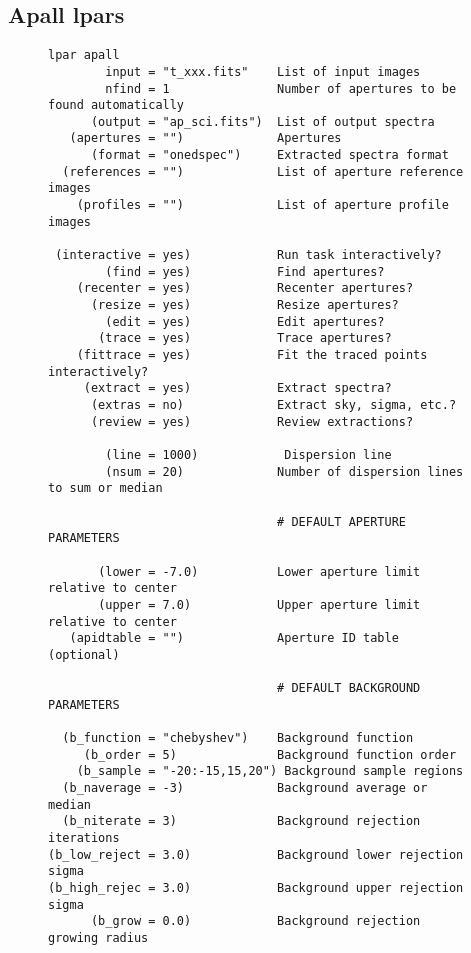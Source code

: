 \subsection{Apall lpars} \label{sec:Apalllpars}

\begin{figure}
\begingroup \fontsize{10pt}{10pt}
\selectfont
{\color{green}
\begin{verbatim} 
lpar apall
        input = "t_xxx.fits"    List of input images
        nfind = 1               Number of apertures to be found automatically
      (output = "ap_sci.fits")  List of output spectra
   (apertures = "")             Apertures
      (format = "onedspec")     Extracted spectra format
  (references = "")             List of aperture reference images
    (profiles = "")             List of aperture profile images
                                
 (interactive = yes)            Run task interactively?
        (find = yes)            Find apertures?
    (recenter = yes)            Recenter apertures?
      (resize = yes)            Resize apertures?
        (edit = yes)            Edit apertures?
       (trace = yes)            Trace apertures?
    (fittrace = yes)            Fit the traced points interactively?
     (extract = yes)            Extract spectra?
      (extras = no)             Extract sky, sigma, etc.?
      (review = yes)            Review extractions?
                                
        (line = 1000)            Dispersion line
        (nsum = 20)             Number of dispersion lines to sum or median
                                
                                # DEFAULT APERTURE PARAMETERS
                                
       (lower = -7.0)           Lower aperture limit relative to center
       (upper = 7.0)            Upper aperture limit relative to center
   (apidtable = "")             Aperture ID table (optional)
                                
                                # DEFAULT BACKGROUND PARAMETERS
                                
  (b_function = "chebyshev")    Background function
     (b_order = 5)              Background function order
    (b_sample = "-20:-15,15,20") Background sample regions
  (b_naverage = -3)             Background average or median
  (b_niterate = 3)              Background rejection iterations
(b_low_reject = 3.0)            Background lower rejection sigma
(b_high_rejec = 3.0)            Background upper rejection sigma
      (b_grow = 0.0)            Background rejection growing radius
                                

\end{verbatim}}
\end{figure}
